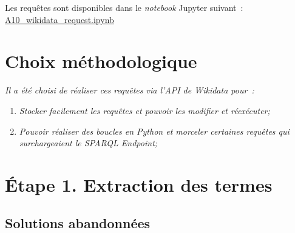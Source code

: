 Les requêtes sont disponibles dans le \textit{notebook} Jupyter suivant~: \href{https://github.com/May8326/Memoire/blob/master/parties/backmatter/annexes/A10_wikidata_request.ipynb}{A10\_wikidata\_request.ipynb}

\section*{Choix méthodologique}

\textit{Il a été choisi de réaliser ces requêtes via l'API de Wikidata pour~:}
\begin{enumerate}
	\item \textit{Stocker facilement les requêtes et pouvoir les modifier et réexécuter;}
	\item \textit{Pouvoir réaliser des boucles en Python et morceler certaines requêtes qui surchargeaient le SPARQL Endpoint;}
\end{enumerate}

\section*{Étape 1. Extraction des termes}

\subsection*{Solutions abandonnées}

